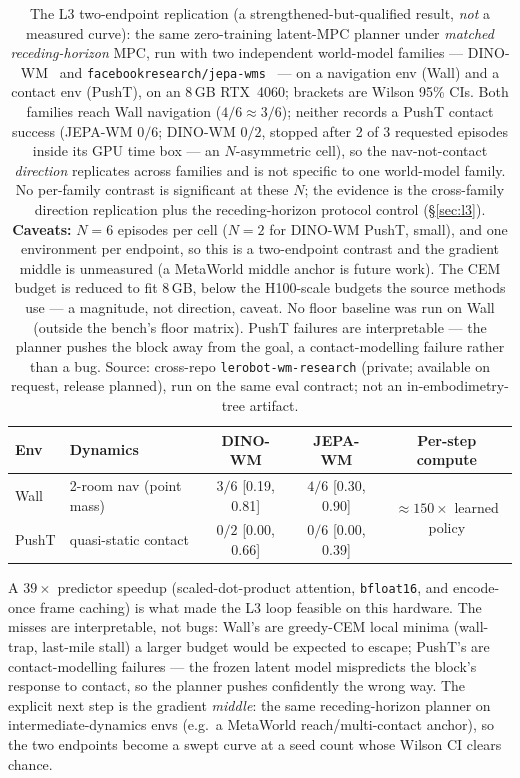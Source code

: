 \documentclass[10pt]{article}
\begin{document}
\begin{table}[t]
\centering
\small
\begin{tabular}{llccc}
\toprule
Env & Dynamics & DINO-WM & JEPA-WM & Per-step compute \\
\midrule
Wall  & 2-room nav (point mass) & $3/6$ [0.19, 0.81] & $4/6$ [0.30, 0.90] & \multirow{2}{*}{${\approx}150\times$ learned policy} \\
PushT & quasi-static contact    & $0/2$ [0.00, 0.66] & $0/6$ [0.00, 0.39] & \\
\bottomrule
\end{tabular}
\caption{The L3 two-endpoint replication (a strengthened-but-qualified
result, \emph{not} a measured curve): the same zero-training latent-MPC
planner under \emph{matched receding-horizon} MPC, run with two independent
world-model families --- DINO-WM~\cite{zhou2024dinowm} and
\texttt{facebookresearch/jepa-wms}~\cite{assran2025vjepa2} --- on a
navigation env (Wall) and a contact env (PushT), on an 8\,GB RTX~4060;
brackets are Wilson 95\% CIs. Both families reach Wall navigation
($4/6 \approx 3/6$); neither records a PushT contact success (JEPA-WM
$0/6$; DINO-WM $0/2$, stopped after 2 of 3 requested episodes inside its
GPU time box --- an $N$-asymmetric cell), so the nav-not-contact
\emph{direction} replicates across families and is not specific to one
world-model family. No per-family contrast is
significant at these $N$; the evidence is the cross-family direction
replication plus the receding-horizon protocol control
(\S\ref{sec:l3}). \textbf{Caveats:} $N{=}6$ episodes per
cell ($N{=}2$ for DINO-WM PushT,
small), and one environment per endpoint, so this is a two-endpoint
contrast and the gradient middle is unmeasured (a MetaWorld middle anchor is
future work). The CEM budget is reduced to fit 8\,GB, below the H100-scale
budgets the source methods use --- a magnitude, not direction, caveat. No
floor baseline was run on Wall (outside the bench's floor matrix).
PushT failures are interpretable --- the planner pushes the block away from
the goal, a contact-modelling failure rather than a bug. Source: cross-repo
\texttt{lerobot-wm-research} (private; available on request, release
planned), run on the same eval contract; not an
in-embodimetry-tree artifact.}
\label{tab:l3}
\end{table}

A $39\times$ predictor speedup (scaled-dot-product attention,
\texttt{bfloat16}, and encode-once frame caching) is what made the L3
loop feasible on this hardware. The misses are interpretable, not bugs:
Wall's are greedy-CEM local minima (wall-trap, last-mile stall) a larger
budget would be expected to escape; PushT's are contact-modelling
failures --- the frozen latent model mispredicts the block's response to
contact, so the planner pushes confidently the wrong way. The explicit
next step is the gradient \emph{middle}: the
same receding-horizon planner on intermediate-dynamics envs (e.g.\ a
MetaWorld reach/multi-contact anchor), so the two endpoints become a swept
curve at a seed count whose Wilson CI clears chance.
\end{document}
